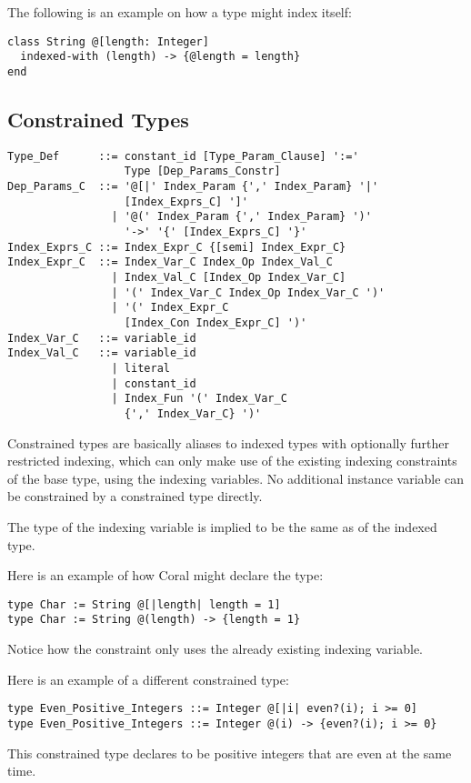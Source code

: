 \example The following is an example on how a  type might index itself: 
\begin{lstlisting}
class String @[length: Integer]
  indexed-with (length) -> {@length = length}
end
\end{lstlisting}






\subsection{Constrained Types}
\label{sec:constrained-types}

\syntax\begin{lstlisting}
Type_Def      ::= constant_id [Type_Param_Clause] ':=' 
                  Type [Dep_Params_Constr]
Dep_Params_C  ::= '@[|' Index_Param {',' Index_Param} '|'
                  [Index_Exprs_C] ']'
                | '@(' Index_Param {',' Index_Param} ')'
                  '->' '{' [Index_Exprs_C] '}'
Index_Exprs_C ::= Index_Expr_C {[semi] Index_Expr_C}
Index_Expr_C  ::= Index_Var_C Index_Op Index_Val_C
                | Index_Val_C [Index_Op Index_Var_C]
                | '(' Index_Var_C Index_Op Index_Var_C ')'
                | '(' Index_Expr_C 
                  [Index_Con Index_Expr_C] ')'
Index_Var_C   ::= variable_id
Index_Val_C   ::= variable_id
                | literal
                | constant_id
                | Index_Fun '(' Index_Var_C 
                  {',' Index_Var_C} ')'
\end{lstlisting}

Constrained types are basically aliases to indexed types with optionally further restricted indexing, which can only make use of the existing indexing constraints of the base type, using the indexing variables. No additional instance variable can be constrained by a constrained type directly. 

The type of the indexing variable is implied to be the same as of the indexed type. 

\example Here is an example of how Coral might declare the  type:
\begin{lstlisting}
type Char := String @[|length| length = 1]
type Char := String @(length) -> {length = 1}
\end{lstlisting}
Notice how the constraint only uses the already existing indexing variable. 

\example Here is an example of a different constrained type: 
\begin{lstlisting}
type Even_Positive_Integers ::= Integer @[|i| even?(i); i >= 0]
type Even_Positive_Integers ::= Integer @(i) -> {even?(i); i >= 0}
\end{lstlisting}
This constrained type declares  to be positive integers that are even at the same time. 






